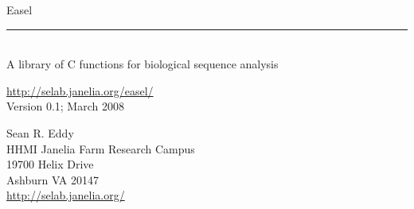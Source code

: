 \begin{titlepage}
{\Large

\vspace*{\fill}

\noindent
{\Huge{Easel}} \\ 
\rule[2pt]{\textwidth}{1pt} \\
\hspace*{\fill} {\large {A library of C functions for
    biological sequence analysis} \\ }

\vspace*{\fill}

\begin{center}
\url{http://selab.janelia.org/easel/}\\
Version 0.1; March 2008 \\ 

\vspace*{\fill}

Sean R. Eddy\\
HHMI Janelia Farm Research Campus\\
19700 Helix Drive\\
Ashburn VA 20147\\
\url{http://selab.janelia.org/}\\
\end{center}

\vspace*{\fill}
}
\end{titlepage}
